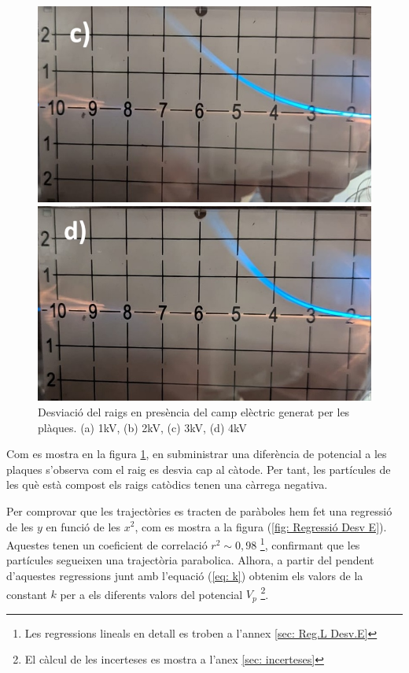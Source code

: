 \documentclass[11pt]{article}
\begin{document}
\begin{figure}[h]
\begin{minipage}{0.38\textwidth}
    \end{minipage}
    \begin{minipage}{0.38\textwidth}
        \centering
        \includegraphics[width=\textwidth]{3kV.jpg}
    \end{minipage}
    \begin{minipage}{0.38\textwidth}
        \centering
        \includegraphics[width=\textwidth]{4kV.jpg}
    \end{minipage}
    \caption{Desviació del raigs en presència del camp elèctric generat per les plàques. (a) 1kV, (b) 2kV, (c) 3kV, (d) 4kV}
    \label{fig: Desv E}
\end{figure}

Com es mostra en la figura \ref{fig: Desv E}, en subministrar una diferència de potencial a les plaques s'observa com el raig es desvia cap al càtode. Per tant, les partícules de les què està compost els raigs catòdics tenen una càrrega negativa.

 Per comprovar que les trajectòries es tracten de paràboles hem fet una regressió de les $y$ en funció de les $x^2$, com es mostra a la figura (\ref{fig: Regressió Desv E}). Aquestes tenen un coeficient de correlació $r^2 \sim 0,98$ \footnote{Les regressions lineals en detall es troben a l'annex \ref{sec: Reg.L Desv.E}}, confirmant que les partícules segueixen una trajectòria parabolica. Alhora, a partir del pendent d'aquestes regressions junt amb l'equació (\ref{eq: k}) obtenim els valors de la constant $k$ per a els diferents valors del potencial $V_p$ \footnote{El càlcul de les incerteses es mostra a l'anex \ref{sec: incerteses}}.
 
\end{document}
